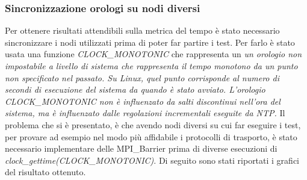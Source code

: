 \subsubsection{Sincronizzazione orologi su nodi diversi}
Per ottenere risultati attendibili sulla metrica del tempo è stato necessario sincronizzare i nodi utilizzati prima di poter far partire i test. Per farlo è stato usata una funzione \emph{CLOCK\_MONOTONIC} che rappresenta un \textit{un orologio non impostabile a livello di sistema che rappresenta il tempo monotono da un punto non specificato nel passato. Su Linux, quel punto corrisponde al numero di secondi di esecuzione del sistema da quando è stato avviato. L'orologio CLOCK\_MONOTONIC non è influenzato da salti discontinui nell'ora del sistema, ma è influenzato dalle regolazioni incrementali eseguite da  NTP.} Il problema che si è presentato, è che avendo nodi diversi su cui far eseguire i test, per provare ad esempio nel modo più affidabile i protocolli di trasporto, è stato necessario implementare delle MPI\_Barrier prima di diverse esecuzioni di \emph{clock\_gettime(CLOCK\_MONOTONIC)}. Di seguito sono stati riportati i grafici del risultato ottenuto.
